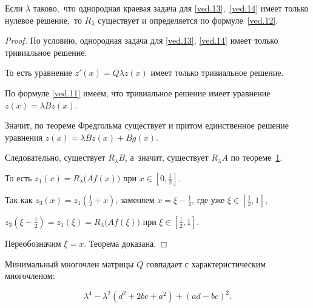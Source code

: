 \smallskip



\hypertarget{kor:th4}{}



\begin{theorem}[4]Если $\lambda$ таково$,$ что однородная краевая задача для \eqref{ved.13}$,$ \eqref{ved.14} имеет только нулевое решение$,$ то $R_{\lambda}$ существует и определяется по формуле~\rm\eqref{ved.12}.

\end{theorem}



\smallskip



\begin{proof}  

По условию, однородная задача для \eqref{ved.13}, \eqref{ved.14} имеет только тривиальное решение. 

То есть уравнение $z'(x)=Q\lambda z(x)$ имеет только тривиальное решение. 

По формуле \eqref{ved.11} имеем, что тривиальное решение имеет уравнение $z(x)=\lambda B z(x)$.  

Значит, по теореме Фредгольма существует и притом единственное решение уравнения $z(x)=\lambda B z(x) +Bg(x)$. 

Следовательно, существует $R_{\lambda}B$, а~значит, существует $R_{\lambda}A$ по теореме~\hyperlink{ved:th1}{1}. 

То есть $z_1(x)=R_{\lambda}\bigl(A f(x) \bigr)$ при   $x\in [0,\frac{1}{2}]$. 

Так как $z_3(x)=z_1(\frac{1}{2}+x)$, заменяем $x=\xi -\frac{1}{2}$, где уже $\xi\in [\frac{1}{2},1]$, 

$z_3(\xi-\frac{1}{2})=z_1(\xi)=R_{\lambda}\bigl(A f(\xi) \bigr) $ при $\xi\in [\frac{1}{2},1]$. 

Переобозначим $\xi =x$.   Теорема доказана.

  \end{proof}

  

\smallskip  

 





Минимальный многочлен матрицы $Q$ совпадает с характеристическим многочленом:

$$

\lambda^4-\lambda^2(d^2+2bc+a^2)+(ad-bc)^2.

$$

